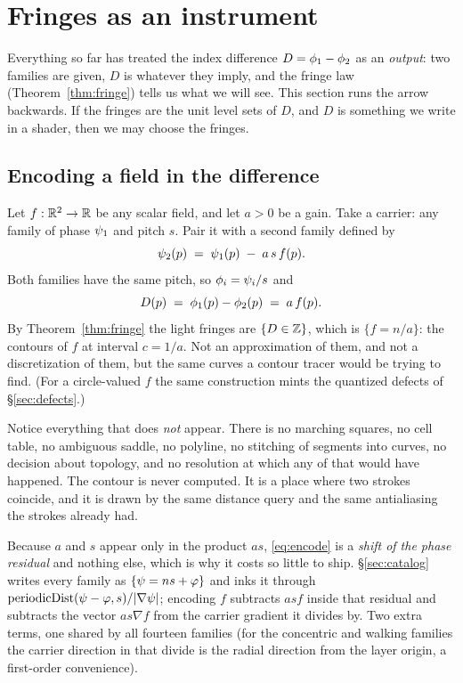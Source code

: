 \section{Fringes as an instrument}
\label{sec:beyond}

Everything so far has treated the index difference $D=\phi_1-\phi_2$ as an
\emph{output}: two families are given, $D$ is whatever they imply, and the fringe
law (Theorem~\ref{thm:fringe}) tells us what we will see. This section runs the
arrow backwards. If the fringes are the unit level sets of $D$, and $D$ is
something we write in a shader, then we may choose the fringes.

\subsection{Encoding a field in the difference}

Let $f:\mathbb{R}^2\to\mathbb{R}$ be any scalar field, and let $a>0$ be a gain. Take a carrier:
any family of phase $\psi_1$ and pitch $s$. Pair it with a second family defined
by
\begin{equation}
  \psi_2(p) \;=\; \psi_1(p) \;-\; a\,s\,f(p).
  \label{eq:encode}
\end{equation}
Both families have the same pitch, so $\phi_i=\psi_i/s$ and
\begin{equation}
  D(p) \;=\; \phi_1(p)-\phi_2(p) \;=\; a\,f(p).
  \label{eq:contourlaw}
\end{equation}
By Theorem~\ref{thm:fringe} the light fringes are $\{D\in\mathbb{Z}\}$, which is
$\{f=n/a\}$: the contours of $f$ at interval $c=1/a$. Not an approximation of
them, and not a discretization of them, but the same curves a contour tracer
would be trying to find. (For a circle-valued $f$ the same construction mints
the quantized defects of \S\ref{sec:defects}.)

Notice everything that does \emph{not} appear. There is no
marching squares, no cell table, no ambiguous saddle, no polyline, no stitching
of segments into curves, no decision about topology, and no resolution at which
any of that would have happened. The contour is never computed. It is a place
where two strokes coincide, and it is drawn by the same distance query and the
same antialiasing the strokes already had.

Because $a$ and $s$ appear only in the product $as$, \eqref{eq:encode} is a
\emph{shift of the phase residual} and nothing else, which is why it costs so
little to ship. \S\ref{sec:catalog} writes every family as $\{\psi=ns+\varphi\}$ and
inks it through $\mathrm{periodicDist}(\psi-\varphi,s)/|\nabla\psi|$; encoding $f$
subtracts $a s f$ inside that residual and subtracts the vector $a s \nabla f$
from the carrier gradient it divides by. Two extra terms, one shared by all
fourteen families (for the concentric and walking families the carrier
direction in that divide is the radial direction from the layer origin, a
first-order convenience).

